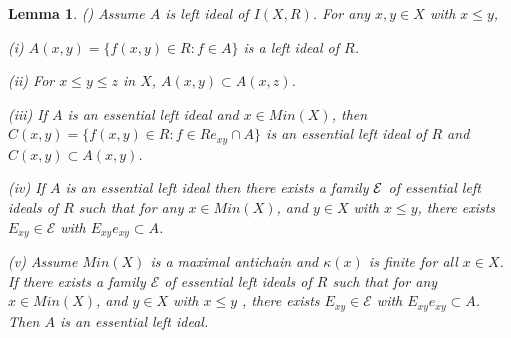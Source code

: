 \documentclass[12pt]{article}
\newtheorem{lemma}[theorem]{Lemma}
\begin{document}
\begin{lemma}
\label{Lemma1-2Singh}(\cite[Lemma 1, Lemma 2]{Singh:MaxQuotientIncAlg})
Assume $A$ is left ideal of ${I(X,R)}$. For any $x,y \in X$ with $x \leq y$,

\textrm{(i)} $A(x, y) =\{f(x, y) \in R : f \in A\}$ is a left ideal of $R$.

\textrm{(ii)} For $x \leq y \leq z$ in $X$, $A(x, y) \subset A(x, z)$.

\textrm{(iii)} If $A$ is an essential left ideal and $x \in Min(X)$, then\newline
$C(x,y)= \{f(x,y) \in R : f \in Re_{xy} \cap A\}$ is an essential left ideal
of $R$ and $C(x,y) \subset A(x, y)$.

\textrm{(iv)} If $A$ is an essential left ideal then there exists a family $\mathcal{%
E}$ of essential left ideals of $R$ such that for any $x \in Min(X)$, and $y
\in X$ with $x \leq y$, there exists $E_{xy} \in \mathcal{E}$ with $%
E_{xy}e_{xy} \subset A$.

\textrm{(v)} Assume $Min(X)$ is a maximal antichain and $\kappa(x)$ is finite for
all $x \in X$. If there exists a family $\mathcal{E}$ of essential left
ideals of $R$ such that for any $x \in Min(X)$, and $y \in X$ with $x \leq y$%
, there exists $E_{xy} \in \mathcal{E}$ with $E_{xy}e_{xy} \subset A$. Then $%
A$ is an essential left ideal.
\end{lemma}

\medskip

%
\end{document}
